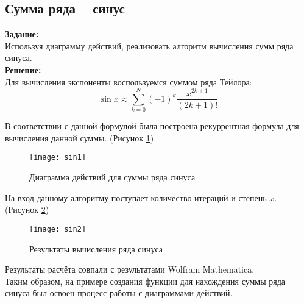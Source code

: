 \subsection*{Сумма ряда -- синус}

\textbf{Задание:}\\
Используя диаграмму действий, реализовать алгоритм вычисления сумм ряда синуса.\\

\textbf{Решение:}\\
Для вычисления экспоненты воспользуемся суммом ряда Тейлора:
\[\sin x \approx \sum_{k = 0}^{N} (-1)^k \dfrac{x^{2k+1}}{(2k+1)!} \]

В соответствии с данной формулой была построена рекуррентная формула для вычисления данной суммы. (Рисунок \ref{fig:sin1})
\begin{figure}[h]
	\centering \texttt{[image: sin1]}
	\caption{Диаграмма действий для суммы ряда синуса}
	\label{fig:sin1}
\end{figure}

На вход данному алгоритму поступает количество итераций и степень $x$. (Рисунок \ref{fig:sin2})
\begin{figure}[h]
	\centering \texttt{[image: sin2]}
	\caption{Результаты вычисления ряда синуса}
	\label{fig:sin2}
\end{figure}

\newpage

Результаты расчёта совпали с результатами Wolfram Mathematica.\\

Таким образом, на примере создания функции для нахождения суммы ряда синуса был освоен процесс работы с диаграммами действий.